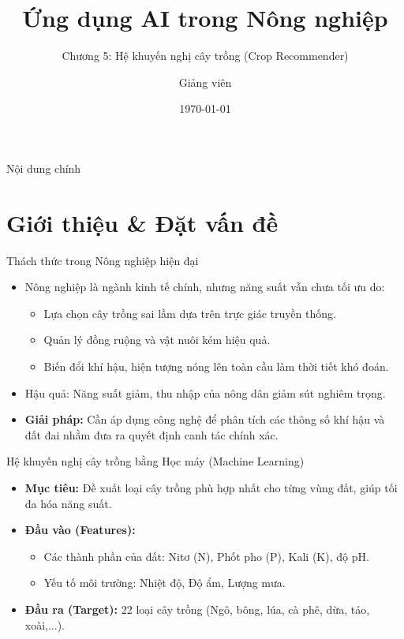 \documentclass[aspectratio=169]{beamer}
\title[Hệ Khuyến nghị Cây trồng]{Ứng dụng AI trong Nông nghiệp}
\subtitle{Chương 5: Hệ khuyến nghị cây trồng (Crop Recommender)}
\author{Giảng viên}
\institute{Đại học Đông Á}
\date{\today}
\begin{document}
\begin{frame}
    \titlepage
\end{frame}

\begin{frame}{Nội dung chính}
    \tableofcontents
\end{frame}

\section{Giới thiệu \& Đặt vấn đề}
\begin{frame}{Thách thức trong Nông nghiệp hiện đại}
    \begin{itemize}
        \item Nông nghiệp là ngành kinh tế chính, nhưng năng suất vẫn chưa tối ưu do:
        \begin{itemize}
            \item Lựa chọn cây trồng sai lầm dựa trên trực giác truyền thống.
            \item Quản lý đồng ruộng và vật nuôi kém hiệu quả.
            \item Biến đổi khí hậu, hiện tượng nóng lên toàn cầu làm thời tiết khó đoán.
        \end{itemize}
        \item Hậu quả: Năng suất giảm, thu nhập của nông dân giảm sút nghiêm trọng.
        \item \textbf{Giải pháp:} Cần áp dụng công nghệ để phân tích các thông số khí hậu và đất đai nhằm đưa ra quyết định canh tác chính xác.
    \end{itemize}
\end{frame}

\begin{frame}{Hệ khuyến nghị cây trồng bằng Học máy (Machine Learning)}
    \begin{itemize}
        \item \textbf{Mục tiêu:} Đề xuất loại cây trồng phù hợp nhất cho từng vùng đất, giúp tối đa hóa năng suất.
        \item \textbf{Đầu vào (Features):}
        \begin{itemize}
            \item Các thành phần của đất: Nitơ (N), Phốt pho (P), Kali (K), độ pH.
            \item Yếu tố môi trường: Nhiệt độ, Độ ẩm, Lượng mưa.
        \end{itemize}
        \item \textbf{Đầu ra (Target):} 22 loại cây trồng (Ngô, bông, lúa, cà phê, dừa, táo, xoài,...).
    \end{itemize}
\end{frame}
\end{document}
